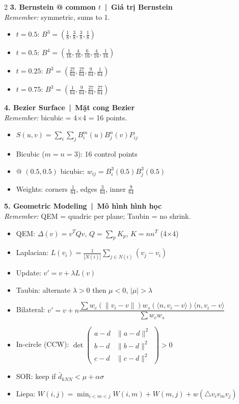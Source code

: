 \begin{multicols}{2}
\textbf{3. Bernstein @ common $t$ \,|\, Giá trị Bernstein}\\
\emph{Remember:} symmetric, sums to 1.
\begin{itemize}
\item $t{=}0.5$:\; $B^3=(\tfrac{1}{8},\tfrac{3}{8},\tfrac{3}{8},\tfrac{1}{8})$
\item $t{=}0.5$:\; $B^4=(\tfrac{1}{16},\tfrac{4}{16},\tfrac{6}{16},\tfrac{4}{16},\tfrac{1}{16})$
\item $t{=}0.25$:\; $B^3=(\tfrac{27}{64},\tfrac{27}{64},\tfrac{9}{64},\tfrac{1}{64})$
\item $t{=}0.75$:\; $B^3=(\tfrac{1}{64},\tfrac{9}{64},\tfrac{27}{64},\tfrac{27}{64})$
\end{itemize}

\textbf{4. Bezier Surface \,|\, Mặt cong Bezier}\\
\emph{Remember:} bicubic = 4$\times$4 = 16 points.
\begin{itemize}
\item $S(u,v)=\sum_{i}\sum_{j}B_i^m(u)B_j^n(v)P_{ij}$
\item Bicubic ($m{=}n{=}3$): 16 control points
\item @ $(0.5,0.5)$ bicubic: $w_{ij}=B_i^3(0.5)B_j^3(0.5)$
\item Weights: corners $\tfrac{1}{64}$, edges $\tfrac{3}{64}$, inner $\tfrac{9}{64}$
\end{itemize}

\textbf{5. Geometric Modeling \,|\, Mô hình hình học}\\
\emph{Remember:} QEM = quadric per plane; Taubin = no shrink.
\begin{itemize}
\item QEM: $\Delta(v)=v^{T}Qv$,\; $Q=\sum_p K_p$,\; $K=nn^{T}$ (4$\times$4)
\item Laplacian: $L(v_i)=\tfrac{1}{|N(i)|}\sum_{j\in N(i)}(v_j-v_i)$
\item Update: $v'=v+\lambda L(v)$
\item Taubin: alternate $\lambda{>}0$ then $\mu{<}0$,\; $|\mu|{>}\lambda$
\item Bilateral: $v'=v+n\dfrac{\sum w_c(\|v_i-v\|)w_s(\langle n,v_i-v\rangle)\langle n,v_i-v\rangle}{\sum w_c w_s}$
\item In-circle (CCW): $\det\!\begin{pmatrix}a-d&\|a-d\|^2\\b-d&\|b-d\|^2\\c-d&\|c-d\|^2\end{pmatrix}\!>0$
\item SOR: keep if $\bar d_{kNN}<\mu+\alpha\sigma$
\item Liepa: $W(i,j)=\min_{i<m<j}W(i,m)+W(m,j)+w(\triangle v_iv_mv_j)$
\end{itemize}


\end{multicols}
